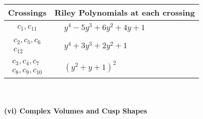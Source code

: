\documentclass[1p]{elsarticle_modified}
\theoremstyle{definition}
\begin{document}
\begin{tabular}{m{50pt}|m{274pt}}
Crossings & \hspace{64pt}Riley Polynomials at each crossing \\
\hline $$\begin{aligned}c_{1},c_{11}\end{aligned}$$&$\begin{aligned}
&y^4-5 y^3+6 y^2+4 y+1
\end{aligned}$\\
\hline $$\begin{aligned}c_{2},c_{5},c_{6}\\c_{12}\end{aligned}$$&$\begin{aligned}
&y^4+3 y^3+2 y^2+1
\end{aligned}$\\
\hline $$\begin{aligned}c_{3},c_{4},c_{7}\\c_{8},c_{9},c_{10}\end{aligned}$$&$\begin{aligned}
&(y^2+y+1)^2
\end{aligned}$\\
\hline
\end{tabular}\\~\\
\newpage\flushleft \textbf{(vi) Complex Volumes and Cusp Shapes}
\end{document}
